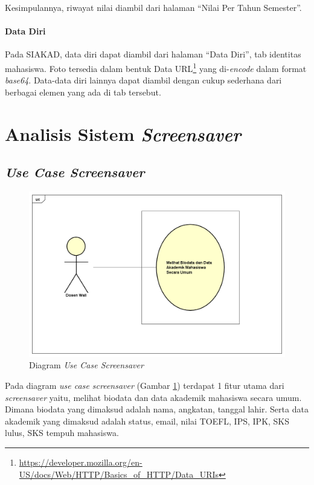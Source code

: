 Kesimpulannya, riwayat nilai diambil dari halaman ``Nilai Per Tahun Semester''.

\paragraph{Data Diri} Pada SIAKAD, data diri dapat diambil dari halaman ``Data Diri'', tab identitas mahasiswa. Foto tersedia dalam bentuk Data URL\footnote{\url{https://developer.mozilla.org/en-US/docs/Web/HTTP/Basics_of_HTTP/Data_URIs}} yang di-\textit{encode} dalam format \textit{base64}. Data-data diri lainnya dapat diambil dengan cukup sederhana dari berbagai elemen yang ada di tab tersebut.


\section{Analisis Sistem \textit{Screensaver}}

\subsection{\textit{Use Case Screensaver}}

\begin{figure}[H]
	\centering
	\includegraphics[scale=0.45]{Gambar/UseCase.png}
	\caption{Diagram \textit{Use Case Screensaver}}
	\label{fig:3_usecase_diagram}
\end{figure}
    
Pada diagram \textit{use case screensaver} (Gambar \ref{fig:3_usecase_diagram}) terdapat 1 fitur utama dari \textit{screensaver} yaitu, melihat biodata dan data akademik mahasiswa secara umum. Dimana biodata yang dimaksud adalah nama, angkatan, tanggal lahir. Serta data akademik yang dimaksud adalah status, email, nilai TOEFL, IPS, IPK, SKS lulus, SKS tempuh mahasiswa.

